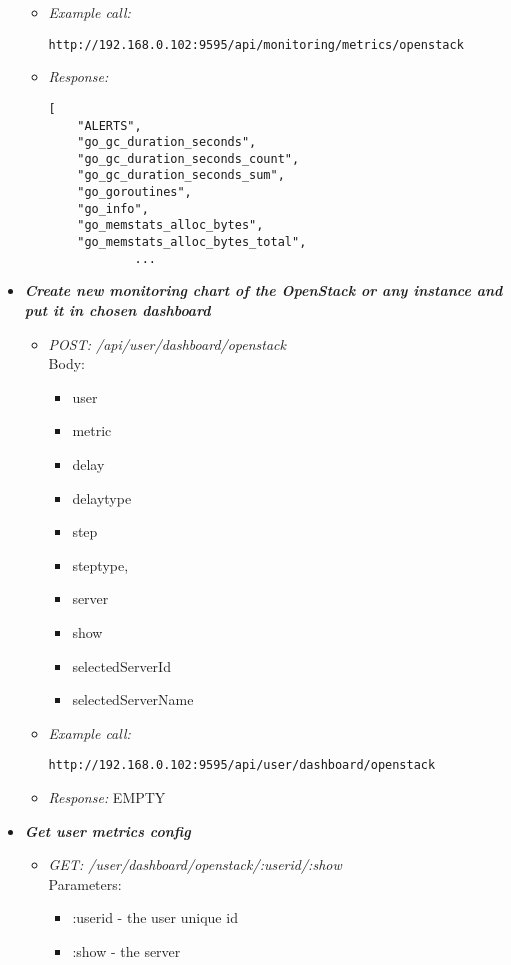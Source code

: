 \begin{itemize}
\begin{itemize}
\item \emph{Example call:}
 \begin{lstlisting}
http://192.168.0.102:9595/api/monitoring/metrics/openstack
\end{lstlisting}

\item \emph{Response:}
 \begin{lstlisting}
[
    "ALERTS",
    "go_gc_duration_seconds",
    "go_gc_duration_seconds_count",
    "go_gc_duration_seconds_sum",
    "go_goroutines",
    "go_info",
    "go_memstats_alloc_bytes",
    "go_memstats_alloc_bytes_total",
            ...
\end{lstlisting}
\end{itemize}


\item \textbf{\textit{Create new monitoring chart of the OpenStack or any instance and put it in chosen dashboard}}
\begin{itemize}
\item \emph{POST: /api/user/dashboard/openstack}
\\Body:
\begin{itemize}
\item  user
\item  metric
\item  delay
\item  delaytype
\item  step
\item steptype,
\item server
\item  show
\item selectedServerId
\item selectedServerName
\end{itemize}

\item \emph{Example call:}
 \begin{lstlisting}
http://192.168.0.102:9595/api/user/dashboard/openstack
\end{lstlisting}

\item \emph{Response:} EMPTY
\end{itemize}


\item \textbf{\textit{Get user metrics config}}
\begin{itemize}
\item \emph{GET: /user/dashboard/openstack/:userid/:show}
\\Parameters:
\begin{itemize}
\item :userid - the user unique id
\item :show - the server 
\end{itemize}


\end{itemize}
\end{itemize}
